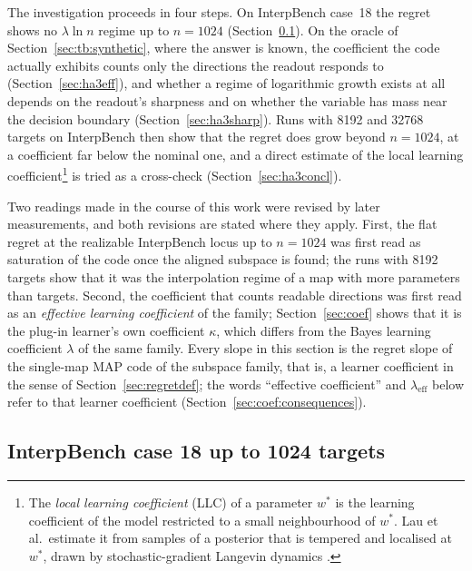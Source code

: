 \documentclass[11pt,a4paper]{article}
\begin{document}
The investigation proceeds in four steps. On InterpBench case~18 the regret shows no $\lambda\ln n$ regime up to $n=1024$ (Section~\ref{sec:ha3ib:ib}). On the oracle of Section~\ref{sec:tb:synthetic}, where the answer is known, the coefficient the code actually exhibits counts only the directions the readout responds to (Section~\ref{sec:ha3eff}), and whether a regime of logarithmic growth exists at all depends on the readout's sharpness and on whether the variable has mass near the decision boundary (Section~\ref{sec:ha3sharp}). Runs with 8192 and 32768 targets on InterpBench then show that the regret does grow beyond $n=1024$, at a coefficient far below the nominal one, and a direct estimate of the local learning coefficient\footnote{The \emph{local learning coefficient} (LLC) of a parameter $w^*$ is the learning coefficient of the model restricted to a small neighbourhood of $w^*$. Lau et al.\ estimate it from samples of a posterior that is tempered and localised at $w^*$, drawn by stochastic-gradient Langevin dynamics \cite{lau2025llc}.} is tried as a cross-check (Section~\ref{sec:ha3concl}).

Two readings made in the course of this work were revised by later measurements, and both revisions are stated where they apply. First, the flat regret at the realizable InterpBench locus up to $n=1024$ was first read as saturation of the code once the aligned subspace is found; the runs with 8192 targets show that it was the interpolation regime of a map with more parameters than targets. Second, the coefficient that counts readable directions was first read as an \emph{effective learning coefficient} of the family; Section~\ref{sec:coef} shows that it is the plug-in learner's own coefficient $\kappa$, which differs from the Bayes learning coefficient $\lambda$ of the same family. Every slope in this section is the regret slope of the single-map MAP code of the subspace family, that is, a learner coefficient in the sense of Section~\ref{sec:regretdef}; the words ``effective coefficient'' and $\lambda_{\mathrm{eff}}$ below refer to that learner coefficient (Section~\ref{sec:coef:consequences}).

\subsection{InterpBench case 18 up to 1024 targets}
\label{sec:ha3ib:ib}
\end{document}
